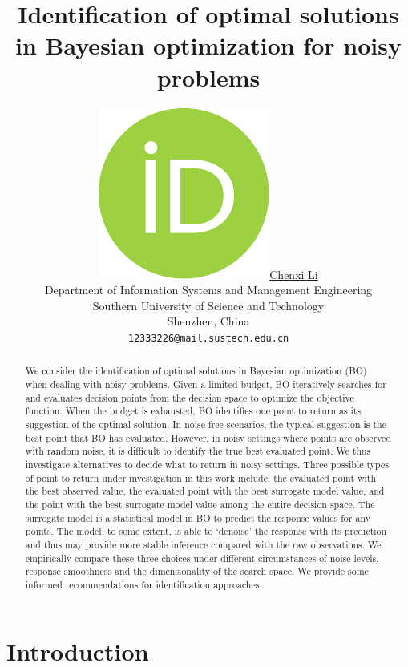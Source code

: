 \documentclass{article}
\title{Identification of optimal solutions in Bayesian optimization for noisy problems}
\date{} 					%
\author{ \href{https://www.sustech.edu.cn/}{\includegraphics[scale=0.06]{orcid.pdf}\hspace{1mm}Chenxi Li} \\
	Department of Information Systems and Management Engineering\\
	Southern University of Science and Technology\\
	Shenzhen, China\\
	\texttt{12333226@mail.sustech.edu.cn} \\
}
\begin{document}
\maketitle

\begin{abstract}
	\hspace{2em}We consider the identification of optimal solutions in Bayesian optimization (BO) when dealing with noisy problems. Given a limited budget, BO iteratively searches for and evaluates decision points from the decision space to optimize the objective function. When the budget is exhausted, BO identifies one point to return as its suggestion of the optimal solution. In noise-free scenarios, the typical suggestion is the best point that BO has evaluated. However, in noisy settings where points are observed with random noise, it is difficult to identify the true best evaluated point. We thus investigate alternatives to decide what to return in noisy settings. Three possible types of point to return under investigation in this work include: the evaluated point with the best observed value, the evaluated point with the best surrogate model value, and the point with the best surrogate model value among the entire decision space. The surrogate model is a statistical model in BO to predict the response values for any points. The model, to some extent, is able to `denoise' the response with its prediction and thus may provide more stable inference compared with the raw observations. We empirically compare these three choices under different circumstances of noise levels, response smoothness and the dimensionality of the search space. We provide some informed recommendations for identification approaches.

\end{abstract}





\section{Introduction}
\end{document}
